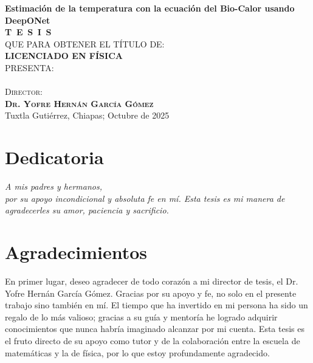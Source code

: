\begin{titlepage}
\begin{minipage}[t][0.95\textheight][c]{0.76\textwidth}
            \begin{center}
                {\Large\bfseries Estimación de la temperatura con la ecuación del Bio-Calor usando DeepONet}\\[2cm]
                \textsc{\huge \textbf{T\, E\, S\, I\, S}}\\[1.5cm]
                \textsc{\large QUE PARA OBTENER EL TÍTULO DE:}\\[0.3cm]
                \textbf{\textsc{LICENCIADO EN FÍSICA}}\\[1.5cm]
                \textsc{\large PRESENTA:}\\[0.3cm]
                \\[0.9cm]
                {\large\scshape Director:\\[0.3cm]
                {\textbf{\large Dr. Yofre Hernán García Gómez }}}\\[2.0cm]
                \large{Tuxtla Gutiérrez, Chiapas; Octubre de 2025}

            \end{center}
\end{minipage}
\end{titlepage}

\pagebreak[2]

\chapter*{Dedicatoria}
\begin{flushright}
\textit{A mis padres y hermanos, \\ por su apoyo incondicional y absoluta fe en mí. Esta tesis es mi manera de agradecerles su amor, paciencia y sacrificio.}
\end{flushright}

\chapter*{Agradecimientos}
En primer lugar, deseo agradecer de todo corazón a mi director de tesis, el Dr. Yofre Hernán García Gómez. Gracias por su apoyo y fe, no solo en el presente trabajo sino también en mí. El tiempo que ha invertido en mi persona ha sido un regalo de lo más valioso; gracias a su guía y mentoría he logrado adquirir conocimientos que nunca habría imaginado alcanzar por mi cuenta. Esta tesis es el fruto directo de su apoyo como tutor y de la colaboración entre la escuela de matemáticas y la de física, por lo que estoy profundamente agradecido.

